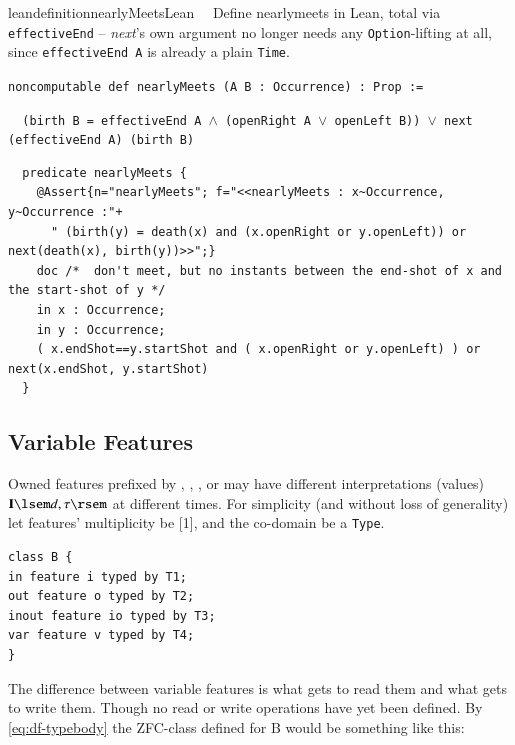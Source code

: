 \begin{restatable}{leandefinition}{nearlyMeetsLean}~~ Define nearlymeets in Lean, total
via \texttt{effectiveEnd} -- \textit{next}'s own argument no longer needs any \texttt{Option}-lifting at all,
since \texttt{effectiveEnd A} is already a plain \texttt{Time}.

\texttt{\textcolor{leancolor}{noncomputable def} \textcolor{leanyellow}{nearlyMeets} (A B : Occurrence) : Prop :=}

\texttt{~~(birth B = effectiveEnd A $\wedge$ (openRight A $\vee$ openLeft B)) $\vee$ next (effectiveEnd A) (birth B)}
\label{nearlyMeets}
\end{restatable}

\begin{lstlisting}
  predicate nearlyMeets {
    @Assert{n="nearlyMeets"; f="<<nearlyMeets : x~Occurrence, y~Occurrence :"+
      " (birth(y) = death(x) and (x.openRight or y.openLeft)) or next(death(x), birth(y))>>";}
    doc /*  don't meet, but no instants between the end-shot of x and the start-shot of y */
    in x : Occurrence;
    in y : Occurrence;
    ( x.endShot==y.startShot and ( x.openRight or y.openLeft) ) or next(x.endShot, y.startShot)
  }
\end{lstlisting}

\subsection{Variable Features}\label{sec:variables}

\pn Owned features prefixed by , , , or  may have different interpretations (values)  $\mathbf{I}\lsem d,\tau\rsem$  at different times.
For simplicity (and without loss of generality) let features' multiplicity be [1], and the co-domain be a \texttt{Type}.

\begin{lstlisting}
class B {
in feature i typed by T1;
out feature o typed by T2;
inout feature io typed by T3;
var feature v typed by T4;
}
\end{lstlisting}

\pn The difference between variable features is what gets to read them and what gets to write them.  Though no read or write operations have yet been defined.
By \ref{eq:df-typebody} the ZFC-class defined for B would be something like this:

